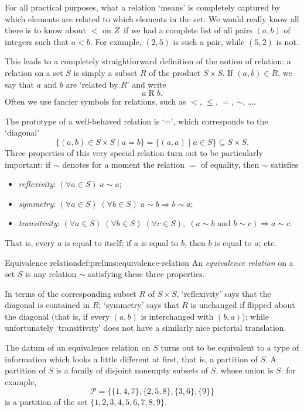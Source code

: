 For all practical purposes, what a relation `means' is completely
captured by which elements are related to which elements in the
set. We would really know all there is to know about $<$ on $Z$ if we
had a complete list of all pairs $(a, b)$ of integers such that
$a < b$. For example, $(2, 5)$ is such a pair, while $(5, 2)$ is not.

This leads to a completely straightforward definition of the notion of
relation: a relation on a set $S$ is simply a subset $R$ of the
product $S \times S$. If $(a, b) \in R$, we say that $a$ and $b$ are
`related by $R$' and write
\[
  a \mathrel{R} b.
\]
Often we use fancier symbols for relations, such as $<$, $\leq$, $=$,
$\sim$, \dots.

The prototype of a well-behaved relation is `=', which corresponds to
the `diagonal'
\[
  \{(a, b) \in S \times S \mid a = b\} = \{(a, a) \mid a \in S\}
  \subseteq S \times S.
\]
Three properties of this very special relation turn out to be
particularly important: if $\sim$ denotes for a moment the relation
$=$ of equality, then $\sim$ satisfies
\begin{itemize}
\item \emph{reflexivity}:
  $(\forall a \in S)\; a \sim a$;
\item \emph{symmetry}:
  $(\forall a \in S)\; (\forall b \in S)\; a \sim b \Rightarrow b \sim
  a$;
\item \emph{transitivity}:
  $(\forall a \in S)\; (\forall b \in S)\; (\forall c \in S),\; (a
  \sim b \text{ and } b \sim c) \Rightarrow a \sim c$.
\end{itemize}
That is, every $a$ is equal to itself; if $a$ is equal to $b$, then
$b$ is equal to $a$; etc.
\begin{defn}{Equivalence relation}{def:prelims:equivalence-relation}%
   An \emph{equivalence relation} on a set
  $S$ is any relation $\sim$ satisfying these three properties.
\end{defn}

In terms of the corresponding subset $R$ of $S \times S$,
`reflexivity' says that the diagonal is contained in $R$; `symmetry'
says that $R$ is unchanged if flipped about the diagonal (that is, if
every $(a, b)$ is interchanged with $(b, a)$); while unfortunately
`transitivity' does not have a similarly nice pictorial translation.

The datum of an equivalence relation on $S$ turns out to be equivalent
to a type of information which looks a little different at first, that
is, a partition of $S$. A partition of $S$ is a family of disjoint
nonempty subsets of $S$, whose union is $S$: for example,
\[\mathcal{P} = \{\{1, 4, 7\}, \{2, 5, 8\}, \{3, 6\}, \{9\}\}\]
is a partition of the set $\{1, 2, 3, 4, 5, 6, 7, 8, 9\}$.

